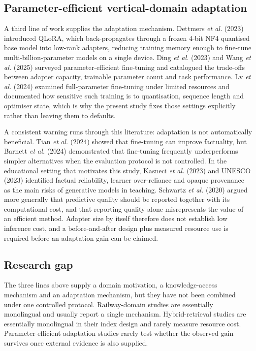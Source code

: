 \documentclass{article}
\begin{document}
\subsection{Parameter-efficient vertical-domain adaptation}

A third line of work supplies the adaptation mechanism. Dettmers \emph{et al.} (2023) introduced QLoRA, which back-propagates through a frozen 4-bit NF4 quantised base model into low-rank adapters, reducing training memory enough to fine-tune multi-billion-parameter models on a single device. Ding \emph{et al.} (2023) and Wang \emph{et al.} (2025) surveyed parameter-efficient fine-tuning and catalogued the trade-offs between adapter capacity, trainable parameter count and task performance. Lv \emph{et al.} (2024) examined full-parameter fine-tuning under limited resources and documented how sensitive such training is to quantisation, sequence length and optimiser state, which is why the present study fixes those settings explicitly rather than leaving them to defaults.

A consistent warning runs through this literature: adaptation is not automatically beneficial. Tian \emph{et al.} (2024) showed that fine-tuning can improve factuality, but Barnett \emph{et al.} (2024) demonstrated that fine-tuning frequently underperforms simpler alternatives when the evaluation protocol is not controlled. In the educational setting that motivates this study, Kasneci \emph{et al.} (2023) and UNESCO (2023) identified factual reliability, learner over-reliance and opaque provenance as the main risks of generative models in teaching. Schwartz \emph{et al.} (2020) argued more generally that predictive quality should be reported together with its computational cost, and that reporting quality alone misrepresents the value of an efficient method. Adapter size by itself therefore does not establish low inference cost, and a before-and-after design plus measured resource use is required before an adaptation gain can be claimed.

\subsection{Research gap}

The three lines above supply a domain motivation, a knowledge-access mechanism and an adaptation mechanism, but they have not been combined under one controlled protocol. Railway-domain studies are essentially monolingual and usually report a single mechanism. Hybrid-retrieval studies are essentially monolingual in their index design and rarely measure resource cost. Parameter-efficient adaptation studies rarely test whether the observed gain survives once external evidence is also supplied.
\end{document}
